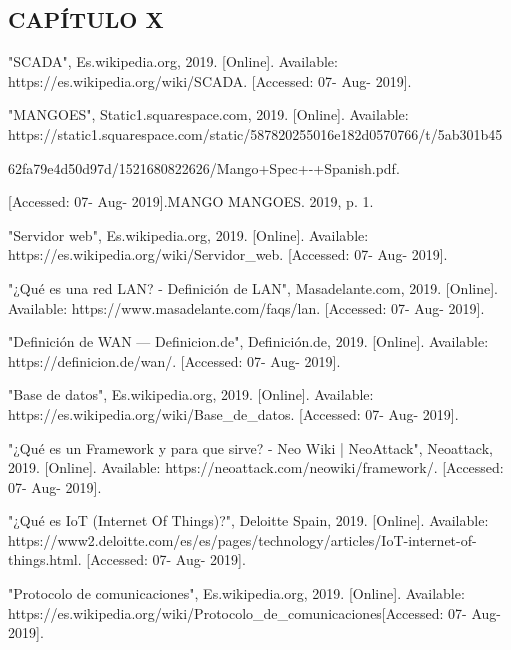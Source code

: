 \begin{center}
    \section*{CAPÍTULO X}
	\vspace*{0.5in}
	\renewcommand{\refname}{BIBLIOGRAFÍA}
\end{center}

\begin{thebibliography}{10}

	 "SCADA", Es.wikipedia.org, 2019. [Online]. Available: https://es.wikipedia.org/wiki/SCADA. [Accessed: 07- Aug- 2019].

	"MANGOES", Static1.squarespace.com, 2019. [Online]. Available: https://static1.squarespace.com/static/587820255016e182d0570766/t/5ab301b45
	
	62fa79e4d50d97d/1521680822626/Mango+Spec+-+Spanish.pdf.
	
	[Accessed: 07- Aug- 2019].{MANGO} MANGOES. 2019, p. 1.
	
	"Servidor web", Es.wikipedia.org, 2019. [Online]. Available: https://es.wikipedia.org/wiki/Servidor\_web. [Accessed: 07- Aug- 2019].
	
	 "¿Qué es una red LAN? - Definición de LAN", Masadelante.com, 2019. [Online]. Available: https://www.masadelante.com/faqs/lan. [Accessed: 07- Aug- 2019].
	
	 "Definición de WAN — Definicion.de", Definición.de, 2019. [Online]. Available: https://definicion.de/wan/. [Accessed: 07- Aug- 2019].
	
	"Base de datos", Es.wikipedia.org, 2019. [Online]. Available: https://es.wikipedia.org/wiki/Base\_de\_datos. [Accessed: 07- Aug- 2019].
	
	"¿Qué es un Framework y para que sirve? - Neo Wiki | NeoAttack", Neoattack, 2019. [Online]. Available: https://neoattack.com/neowiki/framework/. [Accessed: 07- Aug- 2019].
	
	 "¿Qué es IoT (Internet Of Things)?", Deloitte Spain, 2019. [Online]. Available: https://www2.deloitte.com/es/es/pages/technology/articles/IoT-internet-of-things.html. [Accessed: 07- Aug- 2019].
	
	"Protocolo de comunicaciones", Es.wikipedia.org, 2019. [Online]. Available: https://es.wikipedia.org/wiki/Protocolo\_de\_comunicaciones[Accessed: 07- Aug- 2019].
	

\end{thebibliography}
